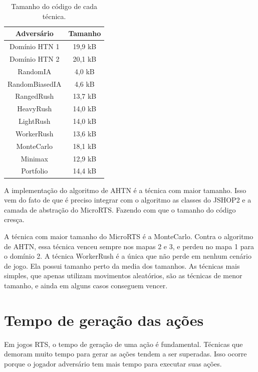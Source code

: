\begin{table}[ht]
	\centering
	\caption{Tamanho do código de cada técnica.}
	\label{tab:tamanho}
	\begin{tabular}{|c|c|}
		\hline
		\textbf{Adversário}     & \textbf{Tamanho} \\ \hline
		Domínio HTN 1           & 19,9 kB          \\ \hline
		Domínio HTN 2           & 20,1 kB          \\ \hline
		RandomIA                & 4,0 kB           \\ \hline
		RandomBiasedIA          & 4,6 kB           \\ \hline
		RangedRush              & 13,7 kB          \\ \hline
		HeavyRush               & 14,0 kB          \\ \hline
		LightRush               & 14,0 kB          \\ \hline
		WorkerRush              & 13,6 kB          \\ \hline
		MonteCarlo              & 18,1 kB          \\ \hline
		Minimax                 & 12,9 kB          \\ \hline
		Portfolio               & 14,4 kB          \\ \hline
	\end{tabular}
\end{table}

A implementação do algoritmo de AHTN é a técnica com maior tamanho.
Isso vem do fato de que é preciso integrar com o algoritmo as classes do JSHOP2 e a camada de abstração do MicroRTS.
Fazendo com que o tamanho do código cresça.%

A técnica com maior tamanho do MicroRTS é a MonteCarlo.
Contra o algoritmo de AHTN, essa técnica venceu sempre nos mapas 2 e 3, e perdeu no mapa 1 para o domínio 2.
A técnica WorkerRush é a única que não perde em nenhum cenário de jogo.
Ela possui tamanho perto da media dos tamanhos.
As técnicas mais simples, que apenas utilizam movimentos aleatórios, são as técnicas de menor tamanho, e ainda em alguns casos conseguem vencer.

\section{Tempo de geração das ações}

Em jogos RTS, o tempo de geração de uma ação é fundamental.
Técnicas que demoram muito tempo para gerar as ações tendem a ser superadas.
Isso ocorre porque o jogador adversário tem mais tempo para executar suas ações.

